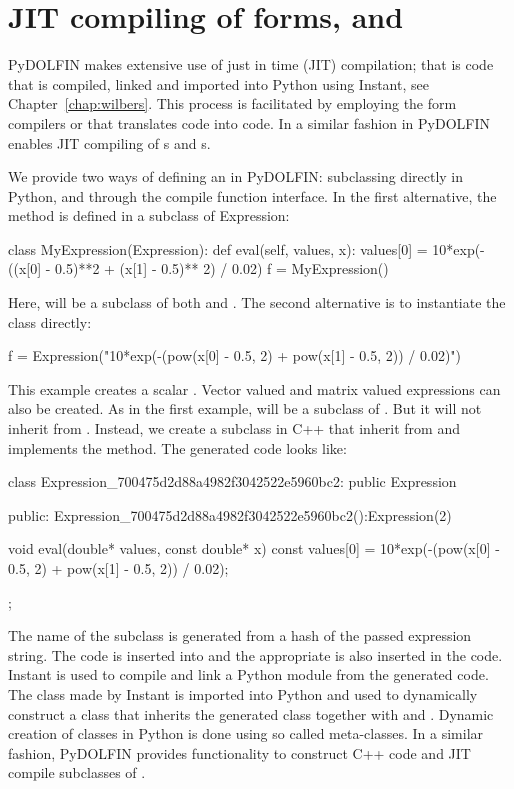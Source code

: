 \section{JIT compiling of \ufl forms,  and }
PyDOLFIN makes extensive use of just in time (JIT) compilation; that is code that is
compiled, linked and imported into Python using Instant, see
Chapter~\ref{chap:wilbers}. This process is facilitated by employing
the form compilers \ffc or \sfc that translates \ufl code into \ufc code. 
In a similar fashion in PyDOLFIN enables JIT compiling of s
and s.  

We provide two ways of defining an  in PyDOLFIN: subclassing  directly in Python, and through the compile
function interface. In the first alternative, the  method is defined in a subclass of Expression:
\begin{python}
class MyExpression(Expression):
    def eval(self, values, x):
        values[0] = 10*exp(-((x[0] - 0.5)**2 + (x[1] - 0.5)** 2) / 0.02)
f = MyExpression()
\end{python}
Here,  will be a subclass of both  and
.  The second alternative is to instantiate the  class directly:
\begin{python}
f = Expression("10*exp(-(pow(x[0] - 0.5, 2) + pow(x[1] - 0.5, 2)) / 0.02)")
\end{python}
This example creates a scalar . Vector valued and matrix
valued expressions can also be created. As in the first example, 
 will be a subclass of . But it will not
inherit from . 
Instead, we create a subclass in C++ that inherit from  and implements the  method.
The generated code looks like:
\begin{c++}
class Expression_700475d2d88a4982f3042522e5960bc2: public Expression{
public:
  Expression_700475d2d88a4982f3042522e5960bc2():Expression(2){}

  void eval(double* values, const double* x) const{
    values[0] = 10*exp(-(pow(x[0] - 0.5, 2) + pow(x[1] - 0.5, 2)) / 0.02);
  }
};
\end{c++}
The name of the subclass is generated from a hash of the passed expression
string. The code is inserted into  and the
appropriate  is also inserted in the code. Instant is used
to compile and link a Python module from the generated code. The class made
by Instant is imported into Python and used to dynamically construct a class 
that inherits the generated class together with  and . 
Dynamic creation of classes in Python is done using so called meta-classes. 
In a similar fashion, PyDOLFIN provides functionality to construct C++
code and JIT compile subclasses of .



